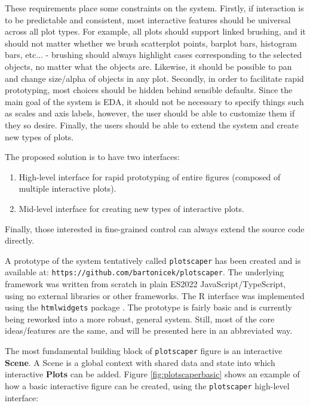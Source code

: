 \documentclass[12pt,a4paper]{article}
\begin{document}
These requirements place some constraints on the system. Firstly, if interaction is to be predictable and consistent, most interactive features should be universal across all plot types. For example, all plots should support linked brushing, and it should not matter whether we brush scatterplot points, barplot bars, histogram bars, etc... - brushing should always highlight cases corresponding to the selected objects, no matter what the objects are. Likewise, it should be possible to pan and change size/alpha of objects in any plot. Secondly, in order to facilitate rapid prototyping, most choices should be hidden behind sensible defaults. Since the main goal of the system is EDA, it should not be necessary to specify things such as scales and axis labels, however, the user should be able to customize them if they so desire. Finally, the users should be able to extend the system and create new types of plots.      

The proposed solution is to have two interfaces: 

\begin{enumerate}
 \item High-level interface for rapid prototyping of entire figures (composed of multiple interactive plots).
 \item Mid-level interface for creating new types of interactive plots. 
\end{enumerate}

Finally, those interested in fine-grained control can always extend the source code directly.   

A prototype of the system tentatively called \texttt{plotscaper} has been created and is available at: \texttt{https://github.com/bartonicek/plotscaper}. The underlying framework was written from scratch in plain ES2022 JavaScript/TypeScript, using no external libraries or other frameworks. The R interface was implemented using the \texttt{htmlwidgets} package \citep{htmlwidgets2021}. The prototype is fairly basic and is currently being reworked into a more robust, general system. Still, most of the core ideas/features are the same, and will be presented here in an abbreviated way.

The most fundamental building block of \texttt{plotscaper} figure is an interactive \textbf{Scene}. A Scene is a global context with shared data and state into which interactive \textbf{Plots} can be added. Figure \ref{fig:plotscaperbasic} shows an example of how a basic interactive figure can be created, using the \texttt{plotscaper} high-level interface:
\end{document}
